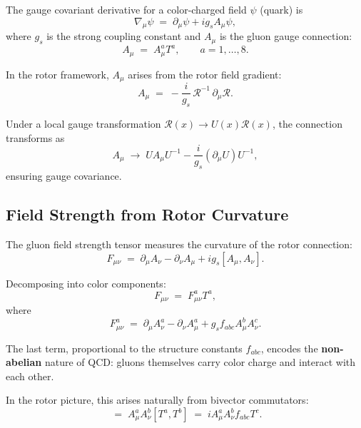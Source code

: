 \documentclass[11pt,a4paper]{article}
\newcommand{\Rotor}{\mathcal{R}}
\newcommand{\D}{\nabla}
\theoremstyle{definition}
\theoremstyle{plain}
\theoremstyle{remark}
\begin{document}
The gauge covariant derivative for a color-charged field $\psi$ (quark) is
\begin{equation}
\D_\mu \psi \;=\; \partial_\mu \psi + ig_s A_\mu \psi,
\label{eq:covariant-derivative}
\end{equation}
where $g_s$ is the strong coupling constant and $A_\mu$ is the gluon gauge connection:
\begin{equation}
A_\mu \;=\; A_\mu^a T^a, \qquad a = 1,\ldots,8.
\label{eq:gluon-connection}
\end{equation}

In the rotor framework, $A_\mu$ arises from the rotor field gradient:
\begin{equation}
A_\mu \;=\; -\frac{i}{g_s}\,\Rotor^{-1}\,\partial_\mu\Rotor.
\label{eq:rotor-connection}
\end{equation}

Under a local gauge transformation $\Rotor(x) \to U(x)\Rotor(x)$, the connection transforms as
\begin{equation}
A_\mu \;\to\; U A_\mu U^{-1} - \frac{i}{g_s}(\partial_\mu U) U^{-1},
\end{equation}
ensuring gauge covariance.

\subsection{Field Strength from Rotor Curvature}

The gluon field strength tensor measures the curvature of the rotor connection:
\begin{equation}
F_{\mu\nu} \;=\; \partial_\mu A_\nu - \partial_\nu A_\mu + ig_s [A_\mu, A_\nu].
\label{eq:field-strength}
\end{equation}

Decomposing into color components:
\begin{equation}
F_{\mu\nu} \;=\; F_{\mu\nu}^a T^a,
\end{equation}
where
\begin{equation}
F_{\mu\nu}^a \;=\; \partial_\mu A_\nu^a - \partial_\nu A_\mu^a + g_s f_{abc} A_\mu^b A_\nu^c.
\label{eq:gluon-field-strength}
\end{equation}

The last term, proportional to the structure constants $f_{abc}$, encodes the \textbf{non-abelian} nature of QCD: gluons themselves carry color charge and interact with each other.

In the rotor picture, this arises naturally from bivector commutators:
\begin{equation}
[A_\mu, A_\nu] \;=\; A_\mu^a A_\nu^b [T^a, T^b] \;=\; i A_\mu^a A_\nu^b f_{abc} T^c.
\end{equation}
\end{document}
